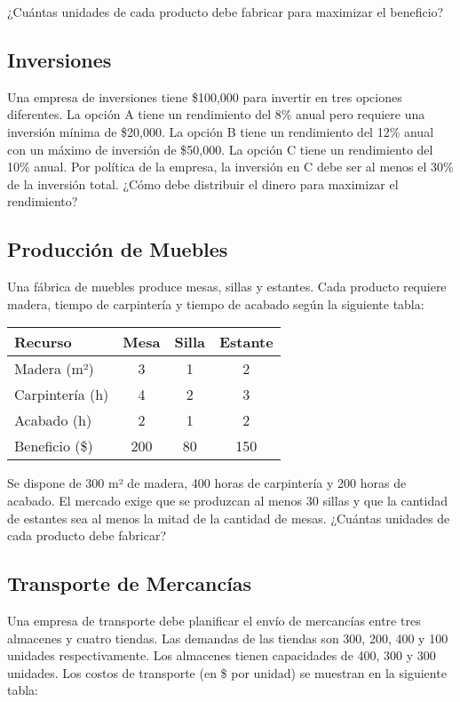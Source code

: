\documentclass[12pt]{article}
\begin{document}
¿Cuántas unidades de cada producto debe fabricar para maximizar el beneficio?

\subsection{Inversiones}

Una empresa de inversiones tiene \$100,000 para invertir en tres opciones diferentes. La opción A tiene un rendimiento del 8\% anual pero requiere una inversión mínima de \$20,000. La opción B tiene un rendimiento del 12\% anual con un máximo de inversión de \$50,000. La opción C tiene un rendimiento del 10\% anual. Por política de la empresa, la inversión en C debe ser al menos el 30\% de la inversión total. ¿Cómo debe distribuir el dinero para maximizar el rendimiento?

\subsection{Producción de Muebles}

Una fábrica de muebles produce mesas, sillas y estantes. Cada producto requiere madera, tiempo de carpintería y tiempo de acabado según la siguiente tabla:

\begin{center}
\begin{tabular}{lccc}
\toprule
Recurso & Mesa & Silla & Estante \\
\midrule
Madera (m²) & 3 & 1 & 2 \\
Carpintería (h) & 4 & 2 & 3 \\
Acabado (h) & 2 & 1 & 2 \\
\midrule
Beneficio (\$) & 200 & 80 & 150 \\
\bottomrule
\end{tabular}
\end{center}

Se dispone de 300 m² de madera, 400 horas de carpintería y 200 horas de acabado. El mercado exige que se produzcan al menos 30 sillas y que la cantidad de estantes sea al menos la mitad de la cantidad de mesas. ¿Cuántas unidades de cada producto debe fabricar?

\subsection{Transporte de Mercancías}

Una empresa de transporte debe planificar el envío de mercancías entre tres almacenes y cuatro tiendas. Las demandas de las tiendas son 300, 200, 400 y 100 unidades respectivamente. Los almacenes tienen capacidades de 400, 300 y 300 unidades. Los costos de transporte (en \$ por unidad) se muestran en la siguiente tabla:
\end{document}
